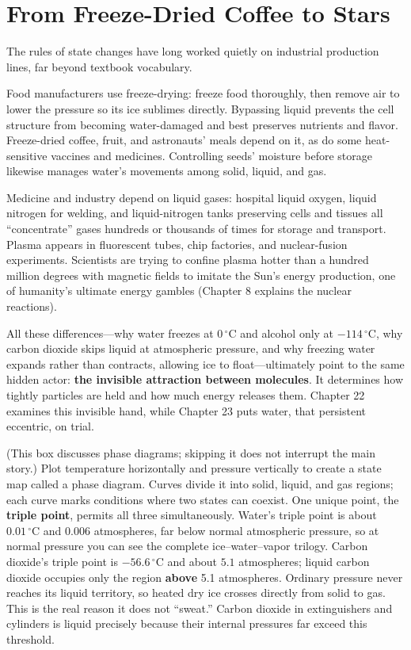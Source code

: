 \section{From Freeze-Dried Coffee to Stars}

The rules of state changes have long worked quietly on industrial production lines, far beyond textbook vocabulary.

Food manufacturers use freeze-drying: freeze food thoroughly, then remove air to lower the pressure so its ice sublimes directly. Bypassing liquid prevents the cell structure from becoming water-damaged and best preserves nutrients and flavor. Freeze-dried coffee, fruit, and astronauts' meals depend on it, as do some heat-sensitive vaccines and medicines. Controlling seeds' moisture before storage likewise manages water's movements among solid, liquid, and gas.

Medicine and industry depend on liquid gases: hospital liquid oxygen, liquid nitrogen for welding, and liquid-nitrogen tanks preserving cells and tissues all ``concentrate'' gases hundreds or thousands of times for storage and transport. Plasma appears in fluorescent tubes, chip factories, and nuclear-fusion experiments. Scientists are trying to confine plasma hotter than a hundred million degrees with magnetic fields to imitate the Sun's energy production, one of humanity's ultimate energy gambles (Chapter 8 explains the nuclear reactions).

All these differences---why water freezes at $0\,^{\circ}\mathrm{C}$ and alcohol only at $-114\,^{\circ}\mathrm{C}$, why carbon dioxide skips liquid at atmospheric pressure, and why freezing water expands rather than contracts, allowing ice to float---ultimately point to the same hidden actor: \textbf{the invisible attraction between molecules}. It determines how tightly particles are held and how much energy releases them. Chapter 22 examines this invisible hand, while Chapter 23 puts water, that persistent eccentric, on trial.

\begin{tiaozhan}
(This box discusses phase diagrams; skipping it does not interrupt the main story.) Plot temperature horizontally and pressure vertically to create a state map called a phase diagram. Curves divide it into solid, liquid, and gas regions; each curve marks conditions where two states can coexist. One unique point, the \textbf{triple point}, permits all three simultaneously. Water's triple point is about $0.01\,^{\circ}\mathrm{C}$ and $0.006$ atmospheres, far below normal atmospheric pressure, so at normal pressure you can see the complete ice--water--vapor trilogy. Carbon dioxide's triple point is $-56.6\,^{\circ}\mathrm{C}$ and about $5.1$ atmospheres; liquid carbon dioxide occupies only the region \textbf{above} 5.1 atmospheres. Ordinary pressure never reaches its liquid territory, so heated dry ice crosses directly from solid to gas. This is the real reason it does not ``sweat.'' Carbon dioxide in extinguishers and cylinders is liquid precisely because their internal pressures far exceed this threshold.
\end{tiaozhan}

